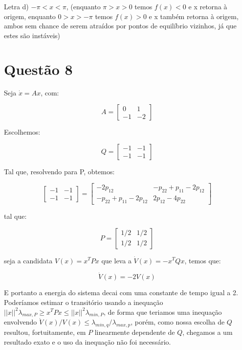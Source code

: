 Letra d) $-\pi<x<\pi$, (enquanto $\pi>x>0$ temos $f(x)<0$ e x retorna à origem, enquanto $0>x>-\pi$ temos $f(x)>0$ e x também retorna à origem, ambos sem chance de serem atraídos por pontos de equilíbrio vizinhos, já que estes são instáveis)\\

\section{Questão 8}

Seja $\dot{x} = Ax$, com:

\[A = 
\begin{bmatrix}
   0 & 1 \\
  -1 & -2
\end{bmatrix}
\]

Escolhemos:

\[Q = \begin{bmatrix}
    -1 & -1\\
    -1 & -1
\end{bmatrix}
\]

Tal que, resolvendo para P, obtemos:

\[\begin{bmatrix}
    -1 & -1\\
    -1 & -1
\end{bmatrix}
=
\begin{bmatrix}
-2p_{12} & -p_{22} + p_{11} - 2p_{12}\\
-p_{22} + p_{11} - 2p_{12} & 2p_{12} - 4p_{22}
\end{bmatrix}
\]

tal que:

\[
P = \begin{bmatrix}
 1/2 & 1/2 \\
 1/2 & 1/2
\end{bmatrix}
\]

seja a candidata $V(x) = x^T P x$ que leva a $\dot{V}(x) = -x^TQx$, temos que:

\begin{equation}
\dot{V}(x) = -2V(x)
\end{equation}

E portanto a energia do sistema decai com uma constante de tempo igual a 2. Poderíamos estimar o transitório usando a inequação $||x||^2 \lambda_{max,P}\geq x^TPx\leq ||x||^2 \lambda_{min,P}$, de forma que teriamos uma inequação envolvendo $\dot{V}(x)/V(x) \leq \lambda_{min,q}/\lambda_{max,p}$, porém, como nossa escolha de $Q$ resultou, fortuitamente, em $P$ linearmente dependente de $Q$, chegamos a um resultado exato e o uso da inequação não foi necessário.